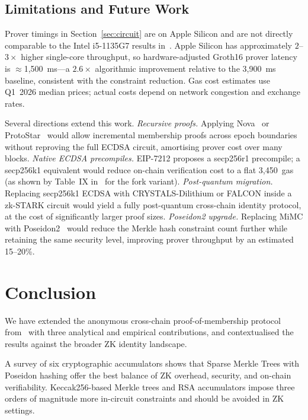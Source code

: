 \documentclass[conference]{IEEEtran}
\begin{document}
\subsection{Limitations and Future Work}

Prover timings in Section~\ref{sec:circuit} are on Apple Silicon and
are not directly comparable to the Intel i5-1135G7 results
in~\cite{Kravchenko2023}.
Apple Silicon has approximately $2$--$3\times$ higher single-core
throughput, so hardware-adjusted Groth16 prover latency is
$\approx$1,500~ms---a $2.6\times$ algorithmic improvement relative to
the 3,900~ms baseline, consistent with the constraint reduction.
Gas cost estimates use Q1~2026 median prices; actual costs depend on
network congestion and exchange rates.

Several directions extend this work.
\emph{Recursive proofs.}
Applying Nova~\cite{Nova} or ProtoStar~\cite{ProtoStar} would allow
incremental membership proofs across epoch boundaries without reproving
the full ECDSA circuit, amortising prover cost over many blocks.
\emph{Native ECDSA precompiles.}
EIP-7212 proposes a secp256r1 precompile; a secp256k1 equivalent would
reduce on-chain verification cost to a flat 3,450~gas (as shown by
Table~IX in~\cite{Kravchenko2023} for the fork variant).
\emph{Post-quantum migration.}
Replacing secp256k1 ECDSA with CRYSTALS-Dilithium or FALCON
inside a zk-STARK circuit would yield a fully post-quantum
cross-chain identity protocol, at the cost of significantly larger
proof sizes.
\emph{Poseidon2 upgrade.}
Replacing MiMC with Poseidon2~\cite{Poseidon2} would reduce the
Merkle hash constraint count further while retaining the same
security level, improving prover throughput by an estimated 15--20\%.

\section{Conclusion}
\label{sec:conclusion}

We have extended the anonymous cross-chain proof-of-membership protocol
from~\cite{Kravchenko2023} with three analytical and empirical
contributions, and contextualised the results against the broader
ZK identity landscape.

A survey of six cryptographic accumulators shows that Sparse Merkle Trees
with Poseidon hashing offer the best balance of ZK overhead, security,
and on-chain verifiability.
Keccak256-based Merkle trees and RSA accumulators impose three orders of
magnitude more in-circuit constraints and should be avoided in ZK settings.
\end{document}

